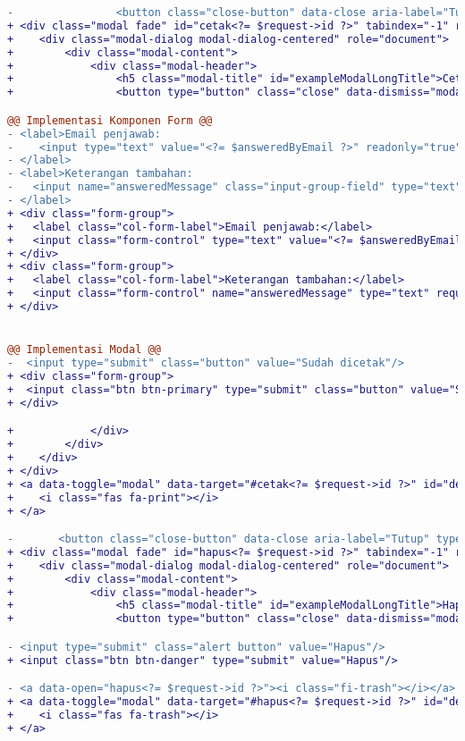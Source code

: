 \begin{lstlisting}[language=diff, caption=Perubahan file \path{\views\TranskripManage\main.php}, label=Entri, basicstyle=\ttfamily, frame=single,
columns=fullflexible, keepspaces=true, breaklines=true]
-                <button class="close-button" data-close aria-label="Tutup" type="button">
+ <div class="modal fade" id="cetak<?= $request->id ?>" tabindex="-1" role="dialog" aria-hidden="true">
+    <div class="modal-dialog modal-dialog-centered" role="document">
+        <div class="modal-content">
+            <div class="modal-header">
+                <h5 class="modal-title" id="exampleModalLongTitle">Cetak Permohonan #<?= $request->id ?></h5>
+                <button type="button" class="close" data-dismiss="modal" aria-label="Close">

@@ Implementasi Komponen Form @@
- <label>Email penjawab:
-	 <input type="text" value="<?= $answeredByEmail ?>" readonly="true"/>
- </label>
- <label>Keterangan tambahan:
-   <input name="answeredMessage" class="input-group-field" type="text" required/>
- </label>
+ <div class="form-group">
+   <label class="col-form-label">Email penjawab:</label>
+   <input class="form-control" type="text" value="<?= $answeredByEmail ?>" readonly="true"/>
+ </div>
+ <div class="form-group">
+   <label class="col-form-label">Keterangan tambahan:</label>
+   <input class="form-control" name="answeredMessage" type="text" required/>
+ </div>


@@ Implementasi Modal @@                                            
-  <input type="submit" class="button" value="Sudah dicetak"/>
+ <div class="form-group">
+  <input class="btn btn-primary" type="submit" class="button" value="Sudah dicetak"/>
+ </div>

+            </div>
+        </div>
+    </div>
+ </div>
+ <a data-toggle="modal" data-target="#cetak<?= $request->id ?>" id="detailIkon<?= $request->id ?>">
+    <i class="fas fa-print"></i>
+ </a>

- 		<button class="close-button" data-close aria-label="Tutup" type="button">
+ <div class="modal fade" id="hapus<?= $request->id ?>" tabindex="-1" role="dialog" aria-hidden="true">
+    <div class="modal-dialog modal-dialog-centered" role="document">
+        <div class="modal-content">
+            <div class="modal-header">
+                <h5 class="modal-title" id="exampleModalLongTitle">Hapus Permohonan #<?= $request->id ?></h5>
+                <button type="button" class="close" data-dismiss="modal" aria-label="Close">

- <input type="submit" class="alert button" value="Hapus"/>
+ <input class="btn btn-danger" type="submit" value="Hapus"/>

- <a data-open="hapus<?= $request->id ?>"><i class="fi-trash"></i></a>
+ <a data-toggle="modal" data-target="#hapus<?= $request->id ?>" id="detailIkon<?= $request->id ?>">
+    <i class="fas fa-trash"></i>
+ </a>
\end{lstlisting}

